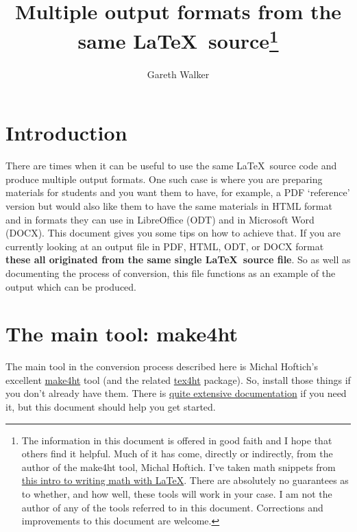 \documentclass[a4paper,12pt]{article}
\begin{document}
\title{Multiple output formats from the same \LaTeX\ source\thanks{The
    information in this document is offered in good faith and I hope
    that others find it helpful.  Much of it has come, directly or
    indirectly, from the author of the make4ht tool, Michal
    Hoftich. I've taken math snippets from
    \href{https://euclid.colorado.edu/~hilljb/latex/intro.to.latex.tex}{this
      intro to writing math with \LaTeX}.  There are absolutely no
    guarantees as to whether, and how well, these tools will work in
    your case. I am not the author of any of the tools referred to in
    this document.  Corrections and improvements to this document are
    welcome.}}  \author{Gareth Walker}
\maketitle
\tableofcontents

\section{Introduction}

There are times when it can be useful to use the same \LaTeX\ source
code and produce multiple output formats.  One such case is where you
are preparing materials for students and you want them to have, for
example, a PDF `reference' version but would also like them to have
the same materials in HTML format and in formats they can use in
LibreOffice (ODT) and in Microsoft Word (DOCX).  This document gives
you some tips on how to achieve that. If you are currently looking at
an output file in PDF, HTML, ODT, or DOCX format \textbf{these all
  originated from the same single \LaTeX\ source file}. So as well as
documenting the process of conversion, this file functions as an
example of the output which can be produced.

\section{The main tool: make4ht}

The main tool in the conversion process described here is Michal
Hoftich's excellent \href{https://ctan.org/pkg/make4ht}{make4ht} tool
(and the related \href{https://ctan.org/pkg/tex4ht}{tex4ht} package).
So, install those things if you don't already have them. There is
\href{https://www.kodymirus.cz/tex4ht-doc/tex4ht-doc.html}{quite
  extensive documentation} if you need it, but this document should
help you get started.
\end{document}
